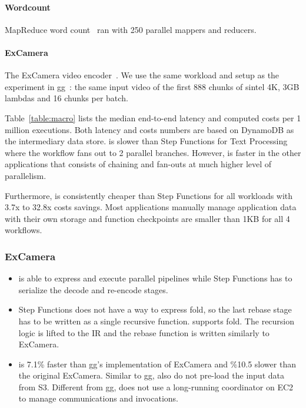 \paragraph{Wordcount} MapReduce word count~\cite{mapreduce} ran with 250
parallel mappers and reducers.

\paragraph{ExCamera} The ExCamera video encoder~\cite{excamera, gg-atc}. We
use the same workload and setup as the experiment in gg~\cite{gg-atc}: the same
input video of the first 888 chunks of sintel 4K, 3GB lambdas and 16 chunks
per batch.

Table~\ref{table:macro} lists the median end-to-end latency and computed costs
per 1 million executions. Both latency and costs numbers are based on DynamoDB
as the intermediary data store. \name{} is slower than Step Functions for Text
Processing where the workflow fans out to 2 parallel branches. However,
\name{} is faster in the other applications that consists of chaining and
fan-outs at much higher level of parallelism.

Furthermore, \name{} is consistently cheaper than Step Functions for all
workloads with 3.7x to 32.8x costs savings. Most applications manually manage
application data with their own storage and function checkpoints are smaller
than 1KB for all 4 workflows.

\subsubsection{ExCamera}\label{sec:eval-excamera}

\begin{itemize}

    \item \name{} is able to express and execute parallel pipelines while Step
    Functions has to serialize the decode and re-encode stages.

    \item Step Functions does not have a way to express fold, so the last
    rebase stage has to be written as a single recursive function. \name{}
    supports fold. The recursion logic is lifted to the \name{} IR and the
    rebase function is written similarly to ExCamera.

    \item \name{} is 7.1\% faster than gg's implementation of ExCamera and
    \%10.5 slower than the original ExCamera. Similar to gg, \name{} also do
    not pre-load the input data from S3. Different from gg, \name{} does not
    use a long-running coordinator on EC2 to manage communications and
    invocations.

\end{itemize}

